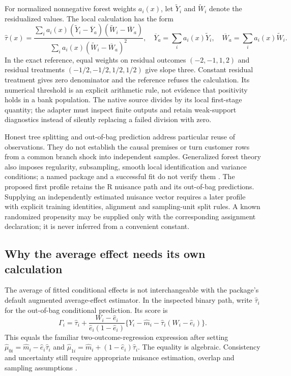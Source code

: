 For normalized nonnegative forest weights \(a_i(x)\), let
\(\widetilde Y_i\) and \(\widetilde W_i\) denote the residualized
values. The local calculation has the form \[
 \widehat\tau(x)=
 \frac{\sum_i a_i(x)(\widetilde Y_i-\overline Y_a)
                         (\widetilde W_i-\overline W_a)}
      {\sum_i a_i(x)(\widetilde W_i-\overline W_a)^2},
 \quad
 \overline Y_a=\sum_i a_i(x)\widetilde Y_i,
 \quad \overline W_a=\sum_i a_i(x)\widetilde W_i.
\] In the exact reference, equal weights on residual outcomes
\((-2,-1,1,2)\) and residual treatments \((-1/2,-1/2,1/2,1/2)\) give
slope three. Constant residual treatment gives zero denominator and the
reference refuses the calculation. Its numerical threshold is an
explicit arithmetic rule, not evidence that positivity holds in a bank
population. The native source divides by its local first-stage quantity;
the adapter must inspect finite outputs and retain weak-support
diagnostics instead of silently replacing a failed division with zero.

Honest tree splitting and out-of-bag prediction address particular reuse
of observations. They do not establish the causal premises or turn
customer rows from a common branch shock into independent samples.
Generalized forest theory also imposes regularity, subsampling, smooth
local identification and variance conditions; a named package and a
successful fit do not verify them \citep{grf2018}. The proposed first
profile retains the R nuisance path and its out-of-bag predictions.
Supplying an independently estimated nuisance vector requires a later
profile with explicit training identities, alignment and sampling-unit
split rules. A known randomized propensity may be supplied only with the
corresponding assignment declaration; it is never inferred from a
convenient constant.

\subsection{Why the average effect needs its own calculation}

The average of fitted conditional effects is not interchangeable with
the package's default augmented average-effect estimator. In the
inspected binary path, write \(\widehat\tau_i\) for the out-of-bag
conditional prediction. Its score is \[
 \Gamma_i=\widehat\tau_i+
 \frac{W_i-\widehat e_i}{\widehat e_i(1-\widehat e_i)}
 \{Y_i-\widehat m_i-\widehat\tau_i(W_i-\widehat e_i)\}.
\] This equals the familiar two-outcome-regression expression after
setting \(\widehat\mu_{0i}=\widehat m_i-\widehat e_i\widehat\tau_i\) and
\(\widehat\mu_{1i}=\widehat m_i+(1-\widehat e_i)\widehat\tau_i\). The
equality is algebraic. Consistency and uncertainty still require
appropriate nuisance estimation, overlap and sampling assumptions
\citep{exec13_grf_rpath}.

